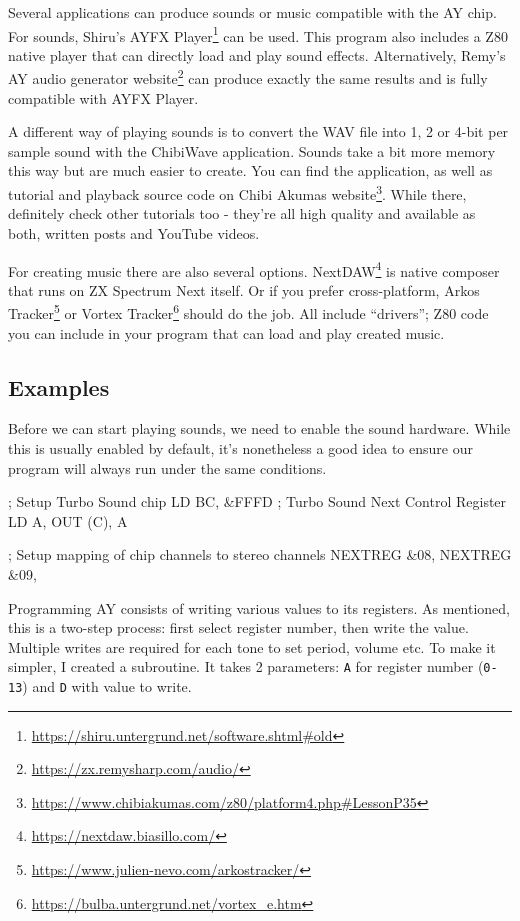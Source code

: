Several applications can produce sounds or music compatible with the AY chip. For sounds, Shiru's AYFX Player\footnote{\url{https://shiru.untergrund.net/software.shtml\#old}} can be used. This program also includes a Z80 native player that can directly load and play sound effects. Alternatively, Remy's AY audio generator website\footnote{\url{https://zx.remysharp.com/audio/}} can produce exactly the same results and is fully compatible with AYFX Player.

A different way of playing sounds is to convert the WAV file into 1, 2 or 4-bit per sample sound with the ChibiWave application. Sounds take a bit more memory this way but are much easier to create. You can find the application, as well as tutorial and playback source code on Chibi Akumas website\footnote{\url{https://www.chibiakumas.com/z80/platform4.php\#LessonP35}}. While there, definitely check other tutorials too - they're all high quality and available as both, written posts and YouTube videos.

For creating music there are also several options. NextDAW\footnote{\url{https://nextdaw.biasillo.com/}} is native composer that runs on ZX Spectrum Next itself. Or if you prefer cross-platform, Arkos Tracker\footnote{\url{https://www.julien-nevo.com/arkostracker/}} or Vortex Tracker\footnote{\url{https://bulba.untergrund.net/vortex_e.htm}} should do the job. All include ``drivers''; Z80 code you can include in your program that can load and play created music.


\pagebreak
\subsection{Examples}

Before we can start playing sounds, we need to enable the sound hardware. While this is usually enabled by default, it's nonetheless a good idea to ensure our program will always run under the same conditions.

\begin{tcblisting}{}
	; Setup Turbo Sound chip
	LD BC, &FFFD            ; Turbo Sound Next Control Register
	LD A, %
	OUT (C), A
	
	; Setup mapping of chip channels to stereo channels
	NEXTREG &08, %
	NEXTREG &09, %
\end{tcblisting}

Programming AY consists of writing various values to its registers. As mentioned, this is a two-step process: first select register number, then write the value. Multiple writes are required for each tone to set period, volume etc. To make it simpler, I created a subroutine. It takes 2 parameters: {\tt A} for register number ({\tt 0-13}) and {\tt D} with value to write.


